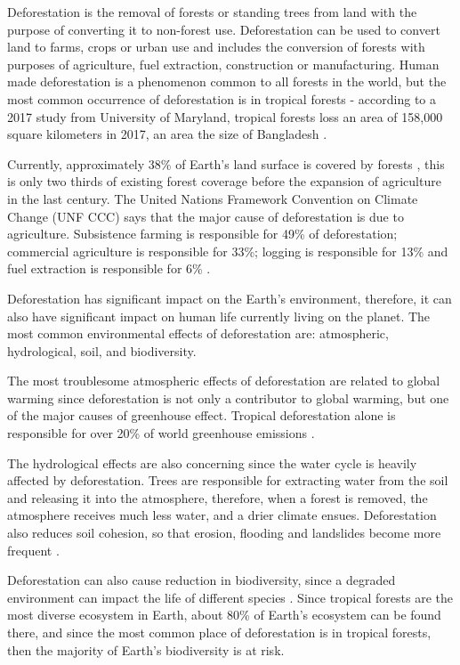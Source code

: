 Deforestation is the removal of forests or standing trees from land
with the purpose of converting it to non-forest use. Deforestation can be used to convert land to farms,
crops or urban use and includes the conversion of forests with purposes of agriculture, fuel extraction,
construction or manufacturing. Human made deforestation is a phenomenon common to all forests in the world, but
the most common occurrence of deforestation is in tropical forests \cite{Alina} - according to a 2017 study from University of Maryland,
tropical forests loss an area of 158,000 square kilometers in 2017, an area the size of Bangladesh \cite{maryland}.

Currently, approximately 38\% of Earth's land surface is covered by forests \cite{WWF}, this is only two thirds of existing
forest coverage before the expansion of agriculture in the last century\cite{WID}. The United Nations Framework Convention on Climate Change
(UNF CCC) says that the major cause of deforestation is due to agriculture. Subsistence farming is responsible for 49\% of deforestation; commercial agriculture
is responsible for 33\%; logging is responsible for 13\% and fuel extraction is responsible for 6\% \cite{UNFCCC}.

Deforestation has significant impact on the Earth's environment, therefore, it can also have significant impact on human life currently living on the planet.
The most common environmental effects of deforestation are: atmospheric, hydrological, soil, and biodiversity.

The most troublesome atmospheric effects of deforestation are related to global warming since deforestation is not only a contributor to global warming, but
one of the major causes of greenhouse effect. Tropical deforestation alone is responsible for over 20\% of world greenhouse emissions \cite{Chirac}.

The hydrological effects are also concerning since the water cycle is heavily affected by deforestation. Trees are responsible for extracting water from the soil
and releasing it into the atmosphere, therefore, when a forest is removed, the atmosphere receives much less water, and a drier climate ensues. Deforestation also reduces soil cohesion,
so that erosion, flooding and landslides become more frequent \cite{Rogge}.

Deforestation can also cause reduction in biodiversity, since a degraded environment can impact the life of different species \cite{umich}. Since
tropical forests are the most diverse ecosystem in Earth, about 80\% of Earth's ecosystem can be found there, and since the most common place of deforestation
is in tropical forests, then the majority of Earth's biodiversity is at risk\cite{Mogato}.


